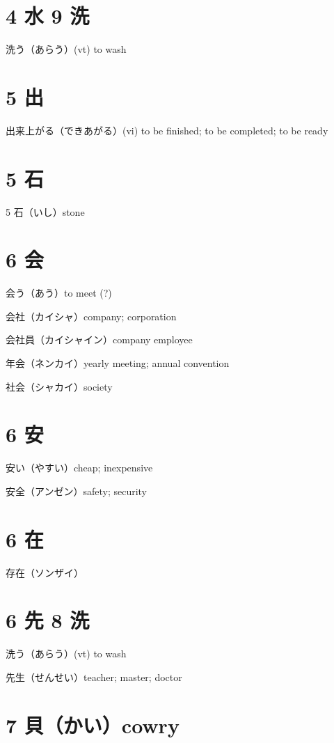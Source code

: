 \section{4 水 9 洗}

洗う（あらう）(vt) to wash

\section{5 出}

出来上がる（できあがる）(vi) to be finished; to be completed; to be ready

\section{5 石}

5 石（いし）stone

\section{6 会}

会う（あう）to meet (?)

会社（カイシャ）company; corporation

会社員（カイシャイン）company employee

年会（ネンカイ）yearly meeting; annual convention

社会（シャカイ）society

\section{6 安}

安い（やすい）cheap; inexpensive

安全（アンゼン）safety; security

\section{6 在}

存在（ソンザイ）

\section{6 先 8 洗}

洗う（あらう）(vt) to wash

先生（せんせい）teacher; master; doctor

\section{7 貝（かい）cowry}

